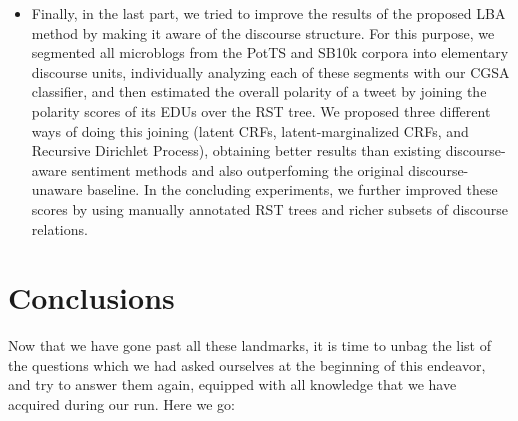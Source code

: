 \begin{itemize}
\item Finally, in the last part, we tried to improve the results of
  the proposed LBA method by making it aware of the discourse
  structure.  For this purpose, we segmented all microblogs from the
  PotTS and SB10k corpora into elementary discourse units,
  individually analyzing each of these segments with our CGSA
  classifier, and then estimated the overall polarity of a tweet by
  joining the polarity scores of its EDUs over the RST tree.  We
  proposed three different ways of doing this joining (latent CRFs,
  latent-marginalized CRFs, and Recursive Dirichlet Process),
  obtaining better results than existing discourse-aware sentiment
  methods and also outperfoming the original discourse-unaware
  baseline.  In the concluding experiments, we further improved these
  scores by using manually annotated RST trees and richer subsets of
  discourse relations.
\end{itemize}

\section*{Conclusions}

Now that we have gone past all these landmarks, it is time to unbag
the list of the questions which we had asked ourselves at the
beginning of this endeavor, and try to answer them again, equipped
with all knowledge that we have acquired during our run.  Here we go:


